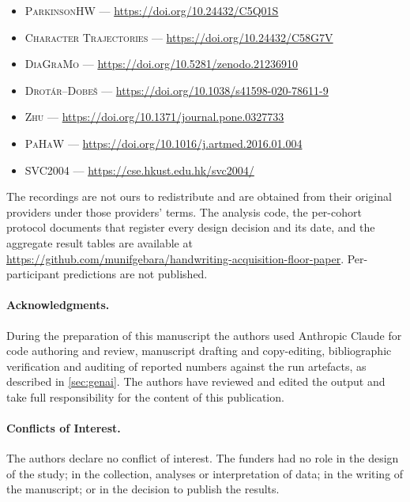\documentclass[10pt,a4paper]{article}
\begin{document}
\begin{itemize}\setlength{\itemsep}{0pt}
\item \textsc{ParkinsonHW} --- \url{https://doi.org/10.24432/C5Q01S}
\item \textsc{Character Trajectories} --- \url{https://doi.org/10.24432/C58G7V}
\item \textsc{DiaGraMo} --- \url{https://doi.org/10.5281/zenodo.21236910}
\item \textsc{Drot\'ar--Dobe\v{s}} --- \url{https://doi.org/10.1038/s41598-020-78611-9}
\item \textsc{Zhu} --- \url{https://doi.org/10.1371/journal.pone.0327733}
\item \textsc{PaHaW} --- \url{https://doi.org/10.1016/j.artmed.2016.01.004}
\item \textsc{SVC2004} --- \url{https://cse.hkust.edu.hk/svc2004/}
\end{itemize}

\noindent The recordings are not ours to redistribute and are
obtained from their original providers under those providers' terms. The analysis code, the
per-cohort protocol documents that register every design decision and its date, and the aggregate
result tables are available at \url{https://github.com/munifgebara/handwriting-acquisition-floor-paper}.
Per-participant predictions are not published.
\endgroup

\paragraph{Acknowledgments.} During the preparation of this manuscript the authors used Anthropic
Claude for code authoring and review, manuscript drafting and copy-editing, bibliographic
verification and auditing of reported numbers against the run artefacts, as described in
\cref{sec:genai}. The authors have reviewed and edited the output and take full responsibility for
the content of this publication.

\paragraph{Conflicts of Interest.} The authors declare no conflict of interest. The funders had no
role in the design of the study; in the collection, analyses or interpretation of data; in the
writing of the manuscript; or in the decision to publish the results.
\end{document}
